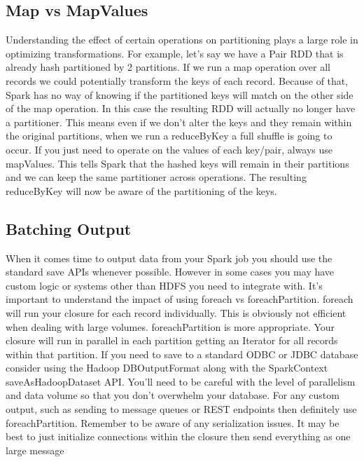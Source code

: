 \documentclass[a4paper,12pt]{article}
\begin{document}
\subsection*{Map vs MapValues}
Understanding the effect of certain operations on partitioning plays a large role in optimizing
transformations. For example, let’s say we have a Pair RDD that is already hash partitioned by 2
partitions. If we run a map operation over all records we could potentially transform the keys of each
record. Because of that, Spark has no way of knowing if the partitioned keys will match on the other side
of the map operation. In this case the resulting RDD will actually no longer have a partitioner. This
means even if we don’t alter the keys and they remain within the original partitions, when we run a
reduceByKey a full shuffle is going to occur.
If you just need to operate on the values of each key/pair, always use mapValues. This tells Spark that
the hashed keys will remain in their partitions and we can keep the same partitioner across operations.
The resulting reduceByKey will now be aware of the partitioning of the keys.
\subsection*{Batching Output}
When it comes time to output data from your Spark job you should use the standard save APIs
whenever possible. However in some cases you may have custom logic or systems other than HDFS you
need to integrate with.
It’s important to understand the impact of using foreach vs foreachPartition. foreach will run your
closure for each record individually. This is obviously not efficient when dealing with large volumes.
foreachPartition is more appropriate. Your closure will run in parallel in each partition getting an Iterator
for all records within that partition.
If you need to save to a standard ODBC or JDBC database consider using the Hadoop DBOutputFormat
along with the SparkContext saveAsHadoopDataset API. You’ll need to be careful with the level of
parallelism and data volume so that you don’t overwhelm your database.
For any custom output, such as sending to message queues or REST endpoints then definitely use
foreachPartition. Remember to be aware of any serialization issues. It may be best to just initialize
connections within the closure then send everything as one large message
\end{document}
